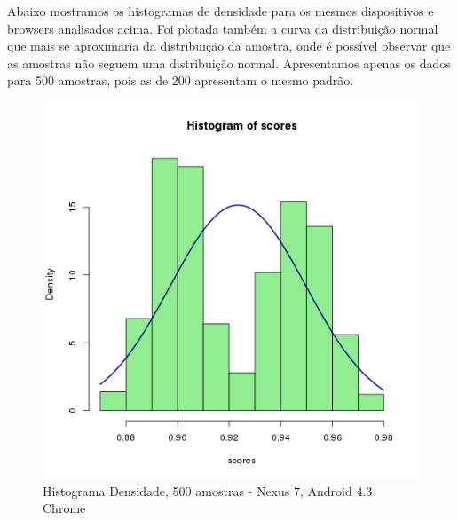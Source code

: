 \documentclass[11pt,a4paper]{article}
\begin{document}
Abaixo mostramos os histogramas de densidade para os mesmos dispositivos e browsers analisados acima. Foi plotada também
a curva da distribuição normal que mais se aproximaria da distribuição da amostra, onde é possível observar que as
amostras não seguem uma distribuição normal. Apresentamos apenas os dados para 500 amostras, pois as de 200 apresentam o
mesmo padrão.

\begin{figure}[H]
    \caption{Histograma Densidade, 500 amostras - Nexus 7, Android 4.3 Chrome}
    \label{nexus43histogramadensidade}
    \centering
    \includegraphics[width=\textwidth]{images/hist-density-n7-a43-chrome-500-amostras-20131119}
\end{figure}
\end{document}
